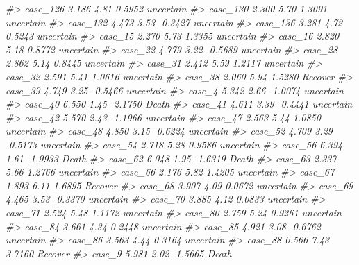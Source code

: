 \documentclass[]{book}
\newenvironment{Shaded}{\begin{snugshade}}{\end{snugshade}}
\newcommand{\CommentTok}[1]{\textcolor[rgb]{0.56,0.35,0.01}{\textit{#1}}}
\begin{document}
\begin{Shaded}
\begin{Highlighting}[]
\CommentTok{#> case_126     3.186        4.81     0.5952         uncertain}
\CommentTok{#> case_130     2.300        5.70     1.3091         uncertain}
\CommentTok{#> case_132     4.473        3.53    -0.3427         uncertain}
\CommentTok{#> case_136     3.281        4.72     0.5243         uncertain}
\CommentTok{#> case_15      2.270        5.73     1.3355         uncertain}
\CommentTok{#> case_16      2.820        5.18     0.8772         uncertain}
\CommentTok{#> case_22      4.779        3.22    -0.5689         uncertain}
\CommentTok{#> case_28      2.862        5.14     0.8445         uncertain}
\CommentTok{#> case_31      2.412        5.59     1.2117         uncertain}
\CommentTok{#> case_32      2.591        5.41     1.0616         uncertain}
\CommentTok{#> case_38      2.060        5.94     1.5280           Recover}
\CommentTok{#> case_39      4.749        3.25    -0.5466         uncertain}
\CommentTok{#> case_4       5.342        2.66    -1.0074         uncertain}
\CommentTok{#> case_40      6.550        1.45    -2.1750             Death}
\CommentTok{#> case_41      4.611        3.39    -0.4441         uncertain}
\CommentTok{#> case_42      5.570        2.43    -1.1966         uncertain}
\CommentTok{#> case_47      2.563        5.44     1.0850         uncertain}
\CommentTok{#> case_48      4.850        3.15    -0.6224         uncertain}
\CommentTok{#> case_52      4.709        3.29    -0.5173         uncertain}
\CommentTok{#> case_54      2.718        5.28     0.9586         uncertain}
\CommentTok{#> case_56      6.394        1.61    -1.9933             Death}
\CommentTok{#> case_62      6.048        1.95    -1.6319             Death}
\CommentTok{#> case_63      2.337        5.66     1.2766         uncertain}
\CommentTok{#> case_66      2.176        5.82     1.4205         uncertain}
\CommentTok{#> case_67      1.893        6.11     1.6895           Recover}
\CommentTok{#> case_68      3.907        4.09     0.0672         uncertain}
\CommentTok{#> case_69      4.465        3.53    -0.3370         uncertain}
\CommentTok{#> case_70      3.885        4.12     0.0833         uncertain}
\CommentTok{#> case_71      2.524        5.48     1.1172         uncertain}
\CommentTok{#> case_80      2.759        5.24     0.9261         uncertain}
\CommentTok{#> case_84      3.661        4.34     0.2448         uncertain}
\CommentTok{#> case_85      4.921        3.08    -0.6762         uncertain}
\CommentTok{#> case_86      3.563        4.44     0.3164         uncertain}
\CommentTok{#> case_88      0.566        7.43     3.7160           Recover}
\CommentTok{#> case_9       5.981        2.02    -1.5665             Death}

\end{Highlighting}
\end{Shaded}
\end{document}
